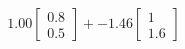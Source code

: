 \documentclass[preview]{standalone}
\begin{document}
\begin{align*}
1.00 \begin{bmatrix} 0.8 \\ 0.5 \end{bmatrix} + -1.46 \begin{bmatrix} 1 \\ 1.6 \end{bmatrix}
\end{align*}
\end{document}
